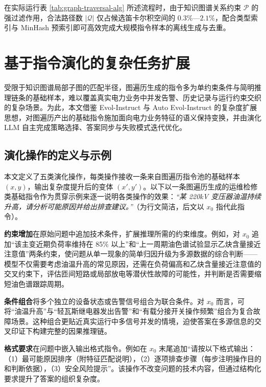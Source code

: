 \documentclass[fontset=fandol,type=master,campus=shenzhen,etitleauto=true]{hithesisbook}
\begin{document}
在实际运行表 \ref{tab:graph-traversal-alg} 所述流程时，由于知识图谱关系约束 $\mathcal{P}$ 的强过滤作用，合法路径数 $|\mathcal{Q}|$ 仅占候选笛卡尔积空间的 $0.3\%$---$2.1\%$，配合类型索引与 MinHash 预索引即可高效完成大规模指令样本的离线生成与去重。

\section{基于指令演化的复杂任务扩展}\label{ux57faux4e8eux6307ux4ee4ux6f14ux5316ux7684ux590dux6742ux4efbux52a1ux6269ux5c55}

受限于知识图谱局部子图的匹配半径，图遍历生成的指令多为单约束条件与简明推理链条的基础样本，难以覆盖真实电力业务中并发告警、历史记录与运行约束交织的复杂场景。为此，本文借鉴 Evol-Instruct\cite{ref25} 与 Auto Evol-Instruct\cite{ref53} 的复杂度扩展思想，对图遍历产出的基础指令施加面向电力业务特征的语义保持变换，并由演化 LLM 自主完成策略选择、答案同步与失败模式迭代优化。

\subsection{演化操作的定义与示例}\label{ux9762ux5411ux4e03ux7c7bux6570ux636eux7c7bux578bux7684ux5deeux5f02ux5316ux6307ux4ee4ux6f14ux5316}

本文定义了五类演化操作，每类操作接收一条来自图遍历指令池的基础样本 $(x, y)$，输出复杂度提升后的变体 $(x', y')$。以下以一条图遍历生成的运维检修类基础指令作为贯穿示例来逐一说明各类操作的效果：\emph{``某 220kV 变压器油温持续升高，请分析可能原因并给出排查建议。''}（为行文简洁，后文以 $x_0$ 指代此指令）。

\textbf{约束增加}在原始问题中追加技术条件，扩展推理所需的约束维度。例如，对 $x_0$ 追加``该主变近期负荷率维持在 85\% 以上''和``上一周期油色谱试验显示乙炔含量接近注意值''两条约束，使问题从单一现象的简单归因升级为多源数据的综合判断------模型不仅需要考虑油温升高的常见原因，还需在负荷偏高和乙炔含量接近注意值的交叉约束下，评估匝间短路或局部放电等潜伏性故障的可能性，并判断是否需要缩短油色谱跟踪周期。

\textbf{条件组合}将多个独立的设备状态或告警信号组合为联合条件。对 $x_0$ 而言，可将``油温升高''与``轻瓦斯继电器发出告警''和``有载分接开关操作频繁''组合为复合故障场景。这种组合更贴近真实运行中多信号并发的情境，迫使答案在多源信息的交叉印证下构建完整的因果推理链。

\textbf{格式要求}在问题中嵌入输出格式指令。例如在 $x_0$ 末尾追加``请按以下格式输出：（1）最可能原因排序（附特征匹配说明），（2）逐项排查步骤（每步注明操作目的和判断依据），（3）安全风险提示''。该操作不改变问题的技术内容，但通过结构化要求提升了答案的组织复杂度。
\end{document}
